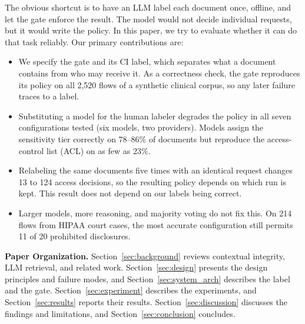 The obvious shortcut is to have an LLM label each document once, offline, and let the gate enforce the result. The model would not decide individual requests, but it would write the policy. In this paper, we try to evaluate whether it can do that task reliably. Our primary contributions are:
\begin{itemize}
  \item We specify the gate and its CI label, which separates what a document
  contains from who may receive it. As a correctness check, the gate reproduces
  its policy on all 2,520 flows of a synthetic clinical corpus, so any later
  failure traces to a label.
  \item Substituting a model for the human labeler degrades the policy in all
  seven configurations tested (six models, two providers). Models assign the
  sensitivity tier correctly on 78--86\% of documents but reproduce the
  access-control list (ACL) on as few as 23\%.
  \item Relabeling the same documents five times with an identical request
  changes 13 to 124 access decisions, so the resulting policy depends on which
  run is kept. This result does not depend on our labels being correct.
  \item Larger models, more reasoning, and majority voting do not fix this. On
  214 flows from HIPAA court cases, the most accurate configuration still
  permits 11 of 20 prohibited disclosures.
\end{itemize}

\noindent\textbf{Paper Organization.} Section~\ref{sec:background} reviews contextual integrity, LLM retrieval, and related work. Section~\ref{sec:design} presents the design principles and failure modes, and Section~\ref{sec:system_arch} describes the label and the gate. Section~\ref{sec:experiment} describes the experiments, and Section~\ref{sec:results} reports their results. Section~\ref{sec:discussion} discusses the findings and limitations, and Section~\ref{sec:conclusion} concludes.